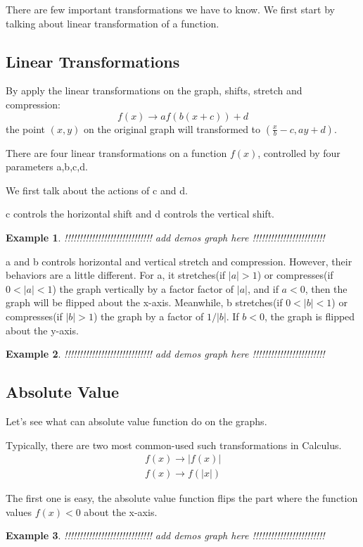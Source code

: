 \documentclass{article}
\newtheorem{ex}{Example}
\begin{document}
There are few important transformations we have to know. We first start by talking about linear transformation of a function. 
\subsection*{Linear Transformations}
By apply the linear transformations on the graph, shifts, stretch and compression: 
\[f(x) \to af(b(x+c)) + d \]
the point $(x,y)$ on the original graph will transformed to $(\frac{x}{b}-c,ay+d)$.


There are four linear transformations on a function $f(x)$, controlled by four parameters a,b,c,d. 

We first talk about the actions of c and d.

c controls the horizontal shift and d controls the vertical shift.

\begin{ex}
	!!!!!!!!!!!!!!!!!!!!!!!!!!!!! add demos graph here !!!!!!!!!!!!!!!!!!!!!!!!
\end{ex}


a and b controls horizontal and vertical stretch and compression. However, their behaviors are a little different. For a, it stretches(if $|a|>1$) or compresses(if $0<|a|<1$) the graph vertically by a factor factor of $|a|$, and if $a<0$, then the graph will be flipped about the x-axis. Meanwhile, b stretches(if $0<|b|<1$) or compresses(if $|b|>1$) the graph by a factor of $1/|b|$. If $b<0$, the graph is flipped about the y-axis.

\begin{ex}
	!!!!!!!!!!!!!!!!!!!!!!!!!!!!! add demos graph here !!!!!!!!!!!!!!!!!!!!!!!!
\end{ex}
      
\subsection*{Absolute Value}
Let's see what can absolute value function do on the graphs. 

Typically, there are two most common-used such transformations in Calculus.
\begin{align}
f(x) \to |f(x)|\\
f(x) \to f(|x|)
\end{align} 

The first one is easy, the absolute value function flips the part where the function values $f(x)<0$ about the x-axis.
\begin{ex}
	!!!!!!!!!!!!!!!!!!!!!!!!!!!!! add demos graph here !!!!!!!!!!!!!!!!!!!!!!!!
\end{ex}
\end{document}

